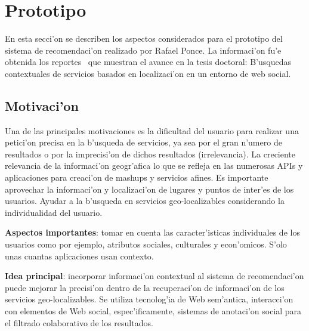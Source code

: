 \documentclass[11pt]{article}
\begin{document}
\section{Prototipo}
En esta secci'on se describen los aspectos considerados para el prototipo del sistema de recomendaci'on realizado por Rafael Ponce. La informaci'on fu'e obtenida los reportes~\cite{rep1:isra,rep2:isra} que muestran el avance en la tesis doctoral: B'usquedas contextuales de servicios basados en localizaci'on en un entorno de web social.


\subsection{Motivaci'on}
Una de las principales motivaciones es la dificultad del usuario para realizar una petici'on precisa en la b'usqueda de servicios, ya sea por el gran n'umero de resultados o por la imprecisi'on de dichos resultados (irrelevancia). La creciente relevancia de la informaci'on geogr'afica lo que se refleja en las numerosas APIs y aplicaciones para creaci'on de mashups y servicios afines. Es importante aprovechar la informaci'on y localizaci'on de lugares y puntos de inter'es de los usuarios. Ayudar a la b'usqueda en servicios geo-localizables considerando la individualidad del usuario.

\textbf{Aspectos importantes}: tomar en cuenta las caracter'isticas individuales de los usuarios como por ejemplo, atributos sociales, culturales y econ'omicos. S'olo unas cuantas aplicaciones usan contexto.

\textbf{Idea principal}: incorporar informaci'on contextual al sistema de recomendaci'on puede mejorar la precisi'on dentro de la recuperaci'on de informaci'on de los servicios geo-localizables. Se utiliza tecnolog'ia de Web sem'antica, interacci'on con elementos de Web social, espec'ificamente, sistemas de anotaci'on social para el filtrado colaborativo de los resultados.
\end{document}
